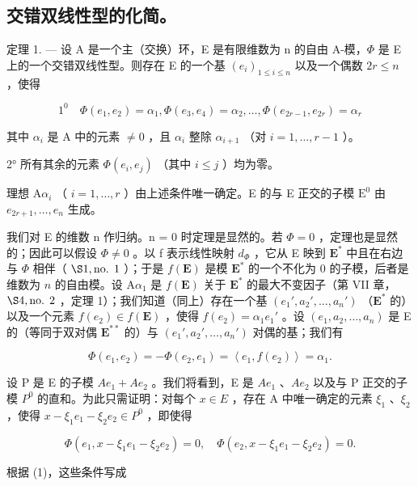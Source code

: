 \subsection{交错双线性型的化简。}

定理 1. --- 设 A 是一个主（交换）环，E 是有限维数为 n 的自由 A-模，\(\Phi\) 是 E 上的一个交错双线性型。则存在 E 的一个基 \((e_i)_{1 \leqslant i \leqslant n}\) 以及一个偶数 \(2r \leqslant n\) ，使得

\[
1 ^ {0} \quad \Phi (e _ {1}, e _ {2}) = \alpha_ {1}, \Phi (e _ {3}, e _ {4}) = \alpha_ {2}, \dots , \Phi (e _ {2 r - 1}, e _ {2 r}) = \alpha_ {r}
\]

其中 \(\alpha_{i}\) 是 A 中的元素 \(\neq 0\) ，且 \(\alpha_{i}\) 整除 \(\alpha_{i+1}\) （对 \(i=1,\ldots,r-1\) ）。

2° 所有其余的元素 \(\Phi(e_{i}, e_{j})\) （其中 \(i \leqslant j\) ）均为零。

理想 \(\mathrm{A}\alpha_{i}\) （ \(i=1,\ldots,r\) ）由上述条件唯一确定。E 的与 E 正交的子模 \(\mathrm{E}^{0}\) 由 \(e_{2r+1},\ldots,e_{n}\) 生成。

我们对 E 的维数 n 作归纳。n = 0 时定理是显然的。若 \(\Phi = 0\) ，定理也是显然的；因此可以假设 \(\Phi \neq 0\) 。以 f 表示线性映射 \(d_{\Phi}\) ，它从 E 映到 \(\mathbf{E}^*\) 中且在右边与 \(\Phi\) 相伴（ \(\S 1, \text{no. 1}\) ）；于是 \(f(\mathbf{E})\) 是模 \(\mathbf{E}^*\) 的一个不化为 0 的子模，后者是维数为 \(n\) 的自由模。设 \(\mathrm{A}\alpha_{1}\) 是 \(f(\mathbf{E})\) 关于 \(\mathbf{E}^*\) 的最大不变因子（第 VII 章， \(\S 4, \text{no. 2}\) ，定理 1）；我们知道（同上）存在一个基 \((e_{1}', a_{2}', \ldots, a_{n}')\) （\(\mathbf{E}^*\) 的）以及一个元素 \(f(e_{2}) \in f(\mathbf{E})\) ，使得 \(f(e_{2}) = \alpha_{1}e_{1}'\) 。设 \((e_{1}, a_{2}, \ldots, a_{n})\) 是 E 的（等同于双对偶 \(\mathbf{E}^{**}\) 的）与 \((e_{1}', a_{2}', \ldots, a_{n}')\) 对偶的基；我们有

\[
\Phi (e _ {1}, e _ {2}) = - \Phi (e _ {2}, e _ {1}) = \left\langle e _ {1}, f (e _ {2}) \right\rangle = \alpha_ {1}.\tag{1}
\]

设 P 是 E 的子模 \(Ae_{1} + Ae_{2}\) 。我们将看到，E 是 \(Ae_{1}\) 、\(Ae_{2}\) 以及与 P 正交的子模 \(P^{0}\) 的直和。为此只需证明：对每个 \(x \in E\) ，存在 A 中唯一确定的元素 \(\xi_{1}\) 、\(\xi_{2}\) ，使得 \(x - \xi_{1}e_{1} - \xi_{2}e_{2} \in P^{0}\) ，即使得

\[
\Phi (e _ {1}, x - \xi_ {1} e _ {1} - \xi_ {2} e _ {2}) = 0, \quad \Phi (e _ {2}, x - \xi_ {1} e _ {1} - \xi_ {2} e _ {2}) = 0.
\]

根据 (1)，这些条件写成


